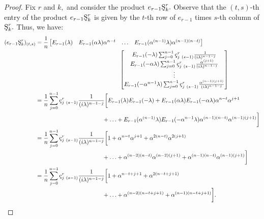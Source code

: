 \documentclass[10pt,reqno,oneside,a4paper]{article}
\begin{document}
\begin{proof}
Fix $r$ and $k,$ and consider the product $e_{r-1}\textup{\c{S}}^r_k.$ Observe that the $(t,s)$-th entry of the product $e_{r-1}\textup{\c{S}}^r_k$ is given by the $t$-th row of $e_{r-1}$ times $s$-th column of $\textup{\c{S}}^r_k.$ Thus, we have:
\begin{align}
(e_{r-1}\textup{\c{S}}^r_k)_{(t,s)} &= \frac{1}{n} 
\begin{bmatrix} E_{r-1}(\lambda) & E_{r-1}(\alpha\lambda)\alpha^{n-t} & \ldots &  E_{r-1}(\alpha^{(n-1)}\lambda)\alpha^{(n-1)(n-t)}
\end{bmatrix} \nonumber \\
&\hspace{5cm}
\begin{bmatrix}
E_{r-1}(-\lambda) \sum^{n-1}_{j=0} \textup{\c{c}}_{j~ (s-1)}^r\frac{1}{(i\lambda)^{n-1-j}}  \\
E_{r-1}(-\alpha \lambda) \sum^{n-1}_{j=0} \textup{\c{c}}_{j~ (s-1)}^r\frac{\alpha^{(j+1)}}{(i\lambda)^{n-1-j}} \\
\vdots \\
E_{r-1}(-\alpha^{n-1} \lambda) \sum^{n-1}_{j=0} \textup{\c{c}}_{j~ (s-1)}^r\frac{\alpha^{(n-1)(j+1)}}{(i\lambda)^{n-1-j}} 
\end{bmatrix}\nonumber \\
&= \frac{1}{n}  \sum^{n-1}_{j=0} \textup{\c{c}}_{j~ (s-1)}^r \frac{1}{(i\lambda)^{n-1-j}} \bigg[ E_{r-1}(\lambda)E_{r-1}(-\lambda) + E_{r-1}(\alpha\lambda)E_{r-1}(-\alpha \lambda)\alpha^{n-t}  \alpha^{j+1} \nonumber\\
&\hspace{4cm}+ \ldots + E_{r-1}(\alpha^{(n-1)}\lambda)E_{r-1}(-\alpha^{n-1} \lambda)\alpha^{(n-1)(n-t)}\alpha^{(n-1)(j+1)} \bigg] \nonumber \\
&= \frac{1}{n}  \sum^{n-1}_{j=0} \textup{\c{c}}_{j~ (s-1)}^r \frac{1}{(i\lambda)^{n-1-j}} \bigg[ 1 + \alpha^{n-t}\alpha^{j+1} + \alpha^{2(n-t)}\alpha^{2(j+1)} \nonumber\\
&\hspace{4cm}+ \ldots + \alpha^{(n-2)(n-t)}\alpha^{(n-2)(j+1)} + \alpha^{(n-1)(n-t)}\alpha^{(n-1)(j+1)}  \bigg]\nonumber\\
&=  \frac{1}{n}  \sum^{n-1}_{j=0} \textup{\c{c}}_{j~ (s-1)}^r \frac{1}{(i\lambda)^{n-1-j}} \bigg[ 1 + \alpha^{n-t+j+1} + \alpha^{2(n-t+j+1)} \nonumber\\
&\hspace{4cm}+ \ldots + \alpha^{(n-2)(n-t+j+1)}+ \alpha^{(n-1)(n-t+j+1)}  \bigg]. \label{DtN.A-eqn1}
\end{align}

\end{proof}
\end{document}
